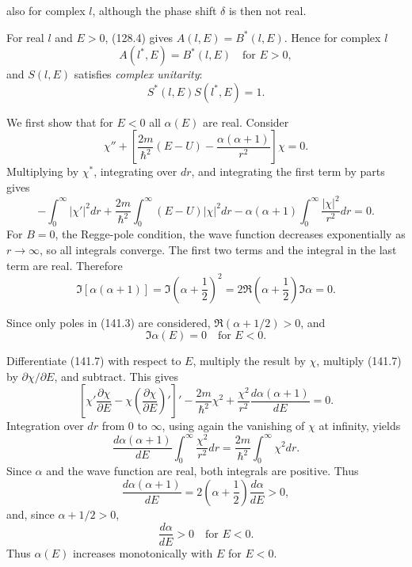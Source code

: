 also for complex $l$, although the phase shift $\delta$ is then not real.

For real $l$ and $E>0$, (128.4) gives $A(l,E)=B^*(l,E)$. Hence for complex $l$
\begin{equation}
 A(l^*,E)=B^*(l,E)\quad\text{for }E>0,
 \tag{141.5}
\end{equation}
and $S(l,E)$ satisfies \emph{complex unitarity}:
\begin{equation}
 S^*(l,E)S(l^*,E)=1.
 \tag{141.6}
\end{equation}



We first show that for $E<0$ all $\alpha(E)$ are real. Consider
\begin{equation}
 \chi''+\left[\frac{2m}{\hbar^2}(E-U)-\frac{\alpha(\alpha+1)}{r^2}\right]\chi=0.
 \tag{141.7}
\end{equation}
Multiplying by $\chi^*$, integrating over $dr$, and integrating the first term by parts gives
\[
 -\int_0^\infty|\chi'|^2dr+\frac{2m}{\hbar^2}\int_0^\infty(E-U)|\chi|^2dr
 -\alpha(\alpha+1)\int_0^\infty\frac{|\chi|^2}{r^2}dr=0.
\]
For $B=0$, the Regge-pole condition, the wave function decreases exponentially as $r\to\infty$, so all integrals converge. The first two terms and the integral in the last term are real. Therefore
\[
 \Im[\alpha(\alpha+1)]=\Im\left(\alpha+\frac12\right)^2
 =2\Re\left(\alpha+\frac12\right)\Im\alpha=0.
\]

Since only poles in (141.3) are considered, $\Re(\alpha+1/2)>0$, and
\begin{equation}
 \Im\alpha(E)=0\quad\text{for }E<0.
 \tag{141.8}
\end{equation}

Differentiate (141.7) with respect to $E$, multiply the result by $\chi$, multiply (141.7) by $\partial\chi/\partial E$, and subtract. This gives
\[
 \left[\chi'\frac{\partial\chi}{\partial E}-\chi\left(\frac{\partial\chi}{\partial E}\right)'\right]'
 -\frac{2m}{\hbar^2}\chi^2+\frac{\chi^2}{r^2}\frac{d\alpha(\alpha+1)}{dE}=0.
\]
Integration over $dr$ from 0 to $\infty$, using again the vanishing of $\chi$ at infinity, yields
\begin{equation}
 \frac{d\alpha(\alpha+1)}{dE}\int_0^\infty\frac{\chi^2}{r^2}dr
 =\frac{2m}{\hbar^2}\int_0^\infty\chi^2dr.
 \tag{141.9}
\end{equation}
Since $\alpha$ and the wave function are real, both integrals are positive. Thus
\[
 \frac{d\alpha(\alpha+1)}{dE}=2\left(\alpha+\frac12\right)\frac{d\alpha}{dE}>0,
\]
and, since $\alpha+1/2>0$,
\[
 \frac{d\alpha}{dE}>0\quad\text{for }E<0.
\]
Thus $\alpha(E)$ increases monotonically with $E$ for $E<0$.

